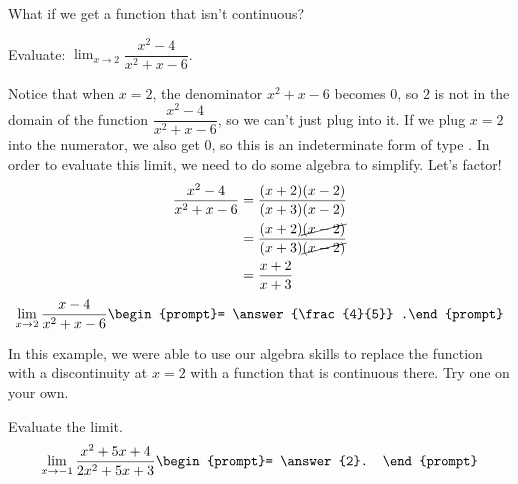 \documentclass{ximera}
\begin{document}
What if we get a function that isn't continuous?  
\begin{example}
	Evaluate: $\displaystyle \lim_{x\to 2} \dfrac{x^2-4}{x^2+x-6}$.
	\begin{explanation}
		Notice that when $x = 2$, the denominator $x^2+x-6$ becomes $0$, so $2$ is not in the domain of the function $\dfrac{x^2-4}{x^2+x-6}$, so we can't just plug into it.
		If we plug $x=2$ into the numerator, we also get $0$, so this is an indeterminate form of type \zeroOverZero.  In order to evaluate this limit, we need to do some algebra to simplify.
		Let's factor!
		\begin{align*}
			\dfrac{x^2-4}{x^2+x-6} &= \dfrac{(x+2)(x-2)}{(x+3)(x-2)}\\
				&= \dfrac{(x+2)\cancel{(x-2)}}{(x+3)\cancel{(x-2)}}\\
				&= \dfrac{x+2}{x+3}
		\end{align*}
		\[ \lim_{x\to 2} \dfrac{x-4}{x^2+x-6} \begin{prompt}= \answer{\frac{4}{5}} .\end{prompt}  \]	
	\end{explanation}
\end{example}

In this example, we were able to use our algebra skills to replace the function with a discontinuity at $x=2$ with a function that is continuous there.  Try one on your own.
\begin{problem}
	Evaluate the limit.
	\[ \lim_{x\to -1} \frac{x^2+5x+4}{2x^2+5x+3} \begin{prompt}= \answer{2}. \end{prompt} \]
\end{problem}
\end{document}
